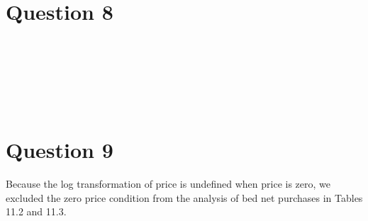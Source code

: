 \documentclass[11pt,notitlepage]{article}\usepackage[]{graphicx}\usepackage[]{color}
\makeatletter
\newenvironment{kframe}{%
 \def\at@end@of@kframe{}%
 \ifinner\ifhmode%
  \def\at@end@of@kframe{\end{minipage}}%
  \begin{minipage}{\columnwidth}%
 \fi\fi%
 \def\FrameCommand##1{\hskip\@totalleftmargin \hskip-\fboxsep
 \colorbox{shadecolor}{##1}\hskip-\fboxsep
     \hskip-\linewidth \hskip-\@totalleftmargin \hskip\columnwidth}%
 \MakeFramed {\advance\hsize-\width
   \@totalleftmargin\z@ \linewidth\hsize
   \@setminipage}}%
 {\par\unskip\endMakeFramed%
 \at@end@of@kframe}
\newenvironment{knitrout}{}{} %
\makeatother
\begin{document}
\section*{Question 8}
\begin{knitrout}
\color{fgcolor}\begin{kframe}
\begin{verbatim}






\end{verbatim}
\end{kframe}
\end{knitrout}

\section*{Question 9}
Because the log transformation of price is undefined when price is zero, we excluded the zero price condition from the analysis of bed net purchases in Tables 11.2 and 11.3.
\end{document}
